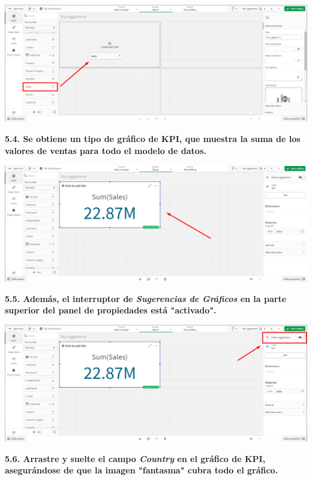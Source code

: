 \documentclass{article}
\begin{document}
    \begin{center}
		\includegraphics[width=14cm]{./images/17} 
	\end{center}

\textbf{5.4. Se obtiene un tipo de gráfico de KPI, que muestra 
la suma de los valores de ventas para todo el modelo de datos.}

    \begin{center}
		\includegraphics[width=14cm]{./images/17.1} 
	\end{center}
\newpage
\textbf{5.5. Además, el interruptor 
de \textit{\textbf{Sugerencias de Gráficos}} en la parte superior del panel de propiedades está "activado".}

    \begin{center}
		\includegraphics[width=14cm]{./images/17.2} 
	\end{center}

\textbf{5.6. Arrastre y suelte el
 campo \textit{Country} en el gráfico de KPI, asegurándose de que la imagen "fantasma" cubra todo el gráfico.}
\end{document}
